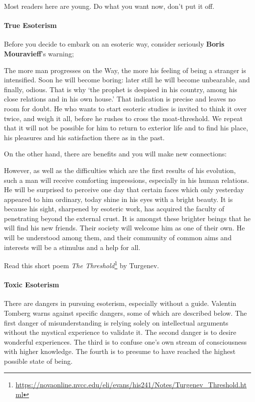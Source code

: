 Most readers here are young. Do what you want now, don't put it off.

\paragraph{True Esoterism}
Before you decide to embark on an esoteric way, consider seriously\textbf{ Boris Mouravieff}'s warning;

\begin{quotex}
The more man progresses on the Way, the more his feeling of being a stranger is intensified. Soon he will become boring: later still he will become unbearable, and finally, odious. That is why `the prophet is despised in his country, among his close relations and in his own house.' That indication is precise and leaves no room for doubt. He who wants to start esoteric studies is invited to think it over twice, and weigh it all, before he rushes to cross the moat-threshold. We repeat that it will not be possible for him to return to exterior life and to find his place, his pleasures and his satisfaction there as in the past.

\end{quotex}
On the other hand, there are benefits and you will make new connections:

\begin{quotex}
However, as well as the difficulties which are the first results of his evolution, such a man will receive comforting impressions, especially in his human relations. He will be surprised to perceive one day that certain faces which only yesterday appeared to him ordinary, today shine in his eyes with a bright beauty. It is because his sight, sharpened by esoteric work, has acquired the faculty of penetrating beyond the external crust. It is amongst these brighter beings that he will find his new friends. Their society will welcome him as one of their own. He will be understood among them, and their community of common aims and interests will be a stimulus and a help for all.

\end{quotex}
Read this short poem \textit{The Threshold}\footnote{\url{https://novaonline.nvcc.edu/eli/evans/his241/Notes/Turgenev_Threshold.html}} by Turgenev.

\paragraph{Toxic Esoterism}
There are dangers in pursuing esoterism, especially without a guide. Valentin Tomberg warns against specific dangers, some of which are described below. The first danger of misunderstanding is relying solely on intellectual arguments without the mystical experience to validate it. The second danger is to desire wonderful experiences. The third is to confuse one's own stream of consciousness with higher knowledge. The fourth is to presume to have reached the highest possible state of being.

